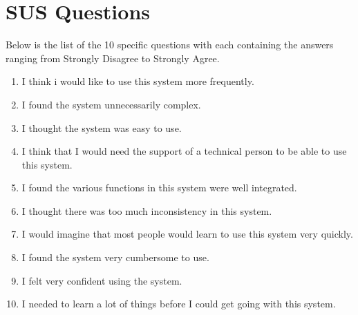 \renewcommand{\thesection}{\Alph{section}}

\section{SUS Questions}\label{SUS}
Below is the list of the 10 specific questions with each containing the answers ranging from Strongly Disagree to Strongly Agree. 

\begin{enumerate}
    \item I think i would like to use this system more frequently.
    \item I found the system unnecessarily complex.
    \item I thought the system was easy to use.
    \item I think that I would need the support of a technical person to be able to use this system.
    \item I found the various functions in this system were well integrated.
    \item I thought there was too much inconsistency in this system.
    \item I would imagine that most people would learn to use this system very quickly.
    \item I found the system very cumbersome to use.
    \item I felt very confident using the system.
    \item I needed to learn a lot of things before I could get going with this system.
\end{enumerate}
